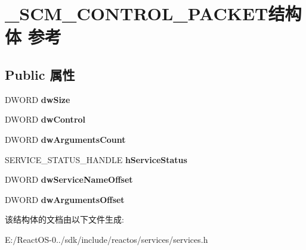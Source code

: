 \hypertarget{struct___s_c_m___c_o_n_t_r_o_l___p_a_c_k_e_t}{}\section{\+\_\+\+S\+C\+M\+\_\+\+C\+O\+N\+T\+R\+O\+L\+\_\+\+P\+A\+C\+K\+E\+T结构体 参考}
\label{struct___s_c_m___c_o_n_t_r_o_l___p_a_c_k_e_t}
\subsection*{Public 属性}
\begin{DoxyCompactItemize}
\item 
\mbox{\label{struct___s_c_m___c_o_n_t_r_o_l___p_a_c_k_e_t_a4718874fe764266b35821b362b584c3c}} 
D\+W\+O\+RD {\bfseries dw\+Size}
\item 
\mbox{\label{struct___s_c_m___c_o_n_t_r_o_l___p_a_c_k_e_t_a2e46fff45bfe745613c7fdb3730479f2}} 
D\+W\+O\+RD {\bfseries dw\+Control}
\item 
\mbox{\label{struct___s_c_m___c_o_n_t_r_o_l___p_a_c_k_e_t_affed3420f53fd95209b9b7f8a28d48b4}} 
D\+W\+O\+RD {\bfseries dw\+Arguments\+Count}
\item 
\mbox{\label{struct___s_c_m___c_o_n_t_r_o_l___p_a_c_k_e_t_a7371b3db9f4bc6b18d02a67b0f313d6c}} 
S\+E\+R\+V\+I\+C\+E\+\_\+\+S\+T\+A\+T\+U\+S\+\_\+\+H\+A\+N\+D\+LE {\bfseries h\+Service\+Status}
\item 
\mbox{\label{struct___s_c_m___c_o_n_t_r_o_l___p_a_c_k_e_t_a10856fb84ffb0d49b28aedfb104c2b89}} 
D\+W\+O\+RD {\bfseries dw\+Service\+Name\+Offset}
\item 
\mbox{\label{struct___s_c_m___c_o_n_t_r_o_l___p_a_c_k_e_t_ab9842cdcf4adfddd99797e1cdb1db4a7}} 
D\+W\+O\+RD {\bfseries dw\+Arguments\+Offset}
\end{DoxyCompactItemize}


该结构体的文档由以下文件生成\+:\begin{DoxyCompactItemize}
\item 
E\+:/\+React\+O\+S-\/0../sdk/include/reactos/services/services.\+h\end{DoxyCompactItemize}
